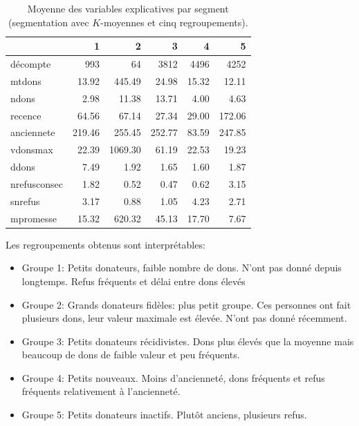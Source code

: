\documentclass[
  11pt,
  letterpaper,
]{scrbook}
\newenvironment{Shaded}{\begin{snugshade}}{\end{snugshade}}
\newcommand{\AttributeTok}[1]{\textcolor[rgb]{0.40,0.45,0.13}{#1}}
\newcommand{\FunctionTok}[1]{\textcolor[rgb]{0.28,0.35,0.67}{#1}}
\newcommand{\NormalTok}[1]{\textcolor[rgb]{0.00,0.23,0.31}{#1}}
\newcommand{\SpecialCharTok}[1]{\textcolor[rgb]{0.37,0.37,0.37}{#1}}
\providecommand{\tightlist}{%
  \setlength{\itemsep}{0pt}\setlength{\parskip}{0pt}}\usepackage{longtable,booktabs,array}
\theoremstyle{definition}
\theoremstyle{remark}
\begin{document}
\begin{Shaded}
\end{Shaded}

\hypertarget{tbl-kmoy5resume}{}
\begin{table}
\caption{\label{tbl-kmoy5resume}Moyenne des variables explicatives par segment (segmentation avec
\(K\)-moyennes et cinq regroupements). }\tabularnewline

\centering
\begin{tabular}{l|r|r|r|r|r}
\hline
  & 1 & 2 & 3 & 4 & 5\\
\hline
décompte & 993 & 64 & 3812 & 4496 & 4252\\
\hline
mtdons & 13.92 & 445.49 & 24.98 & 15.32 & 12.11\\
\hline
ndons & 2.98 & 11.38 & 13.71 & 4.00 & 4.63\\
\hline
recence & 64.56 & 67.14 & 27.34 & 29.00 & 172.06\\
\hline
anciennete & 219.46 & 255.45 & 252.77 & 83.59 & 247.85\\
\hline
vdonsmax & 22.39 & 1069.30 & 61.19 & 22.53 & 19.23\\
\hline
ddons & 7.49 & 1.92 & 1.65 & 1.60 & 1.87\\
\hline
nrefusconsec & 1.82 & 0.52 & 0.47 & 0.62 & 3.15\\
\hline
snrefus & 3.17 & 0.88 & 1.05 & 4.23 & 2.71\\
\hline
mpromesse & 15.32 & 620.32 & 45.13 & 17.70 & 7.67\\
\hline
\end{tabular}
\end{table}

Les regroupements obtenus sont interprétables:

\begin{itemize}
\tightlist
\item
  Groupe 1: Petits donateurs, faible nombre de dons. N'ont pas donné
  depuis longtemps. Refus fréquents et délai entre dons élevés
\item
  Groupe 2: Grands donateurs fidèles: plus petit groupe. Ces personnes
  ont fait plusieurs dons, leur valeur maximale est élevée. N'ont pas
  donné récemment.
\item
  Groupe 3: Petits donateurs récidivistes. Dons plus élevés que la
  moyenne mais beaucoup de dons de faible valeur et peu fréquents.
\item
  Groupe 4: Petits nouveaux. Moins d'ancienneté, dons fréquents et refus
  fréquents relativement à l'ancienneté.
\item
  Groupe 5: Petits donateurs inactifs. Plutôt anciens, plusieurs refus.
\end{itemize}
\end{document}
